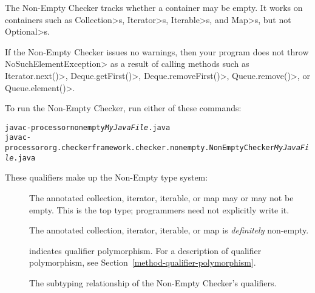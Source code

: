 \htmlhr
{}

The Non-Empty Checker tracks whether a container may be empty.
It works on containers such as
\<Collection>s, \<Iterator>s, \<Iterable>s, and \<Map>s, but not \<Optional>s.

If the Non-Empty Checker issues no warnings, then your program does not
throw \<NoSuchElementException> as a result of calling methods such as
\<Iterator.next()>,
\<Deque.getFirst()>, \<Deque.removeFirst()>, \<Queue.remove()>, or
\<Queue.element()>.

To run the Non-Empty Checker, run either of these commands:

\begin{alltt}
  javac -processor nonempty \emph{MyJavaFile}.java
  javac -processor org.checkerframework.checker.nonempty.NonEmptyChecker \emph{MyJavaFile}.java
\end{alltt}



These qualifiers make up the Non-Empty type system:

\begin{description}

\item[]
  The annotated collection, iterator, iterable, or map may or may not be empty.
  This is the top type; programmers need not explicitly write it.

\item[]
  The annotated collection, iterator, iterable, or map is \emph{definitely}
  non-empty.

\item[]
  indicates qualifier polymorphism.
  For a description of qualifier polymorphism, see
  Section~\ref{method-qualifier-polymorphism}.

\end{description}

\begin{figure}
\caption{The subtyping relationship of the Non-Empty Checker's qualifiers.}
\label{fig-nonempty-hierarchy}
\end{figure}


